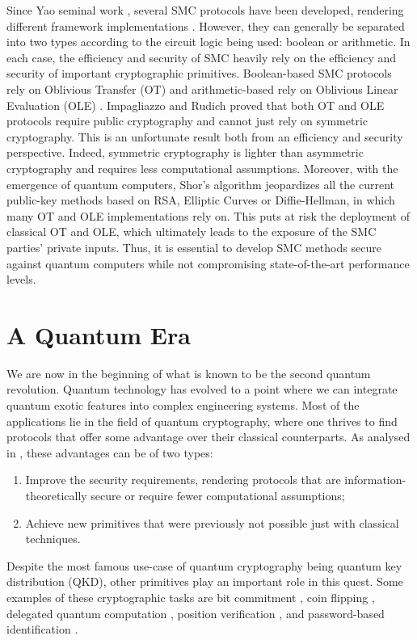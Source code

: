 Since Yao seminal work \cite{Y86}, several SMC protocols have been developed, rendering different framework implementations \cite{Goldreich87, Bendlin11, D12}. However, they can generally be separated into two types according to the circuit logic being used: boolean or arithmetic. In each case, the efficiency and security of SMC heavily rely on the efficiency and security of important cryptographic primitives. Boolean-based SMC protocols rely on Oblivious Transfer (OT) \cite{K88} and arithmetic-based rely on Oblivious Linear Evaluation (OLE) \cite{DPSZ12}. Impagliazzo and Rudich \cite{IR99} proved that both OT and OLE protocols require public cryptography and cannot just rely on symmetric cryptography. This is an unfortunate result both from an efficiency and security perspective. Indeed, symmetric cryptography is lighter than asymmetric cryptography and requires less computational assumptions\cite{GetCitation}. Moreover, with the emergence of quantum computers, Shor’s algorithm \cite{Sho95} jeopardizes all the current public-key methods based on RSA, Elliptic Curves or Diffie-Hellman, in which many OT and OLE implementations rely on. This puts at risk the deployment of classical OT and OLE, which ultimately leads to the exposure of the SMC parties’ private inputs. Thus, it is essential to develop SMC methods secure against quantum computers while not compromising state-of-the-art performance levels.


\section*{A Quantum Era}

We are now in the beginning of what is known to be
the second quantum revolution. Quantum technology has evolved to a point where we can integrate quantum exotic features into complex engineering systems. Most of the applications lie in the field of quantum cryptography, where one thrives to find protocols that offer some advantage over their classical counterparts. As analysed in \cite{B15, PSAN13}, these advantages can be of two types:

\begin{enumerate}
    \item Improve the security requirements, rendering protocols that are information-theoretically secure or require fewer computational assumptions;
    \item Achieve new primitives that were previously not possible just with classical techniques.
\end{enumerate}
Despite the most famous use-case of quantum cryptography being quantum key distribution (QKD), other primitives play an important role in this quest. Some examples of these cryptographic tasks are bit commitment \cite{CK11}, coin flipping \cite{CK09}, delegated quantum computation \cite{BFK09}, position verification \cite{Unr14}, and password-based identification \cite{DFSS14, DFLSS09}. 

